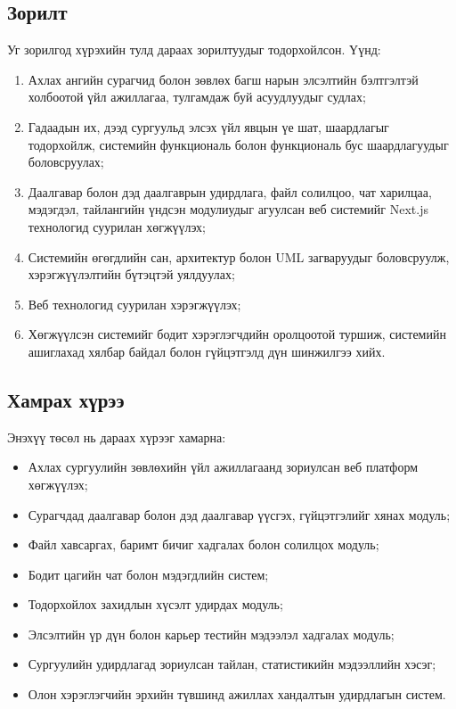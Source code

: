 \subsection*{Зорилт}
Уг зорилгод хүрэхийн тулд дараах зорилтуудыг тодорхойлсон. Үүнд:
\begin{enumerate}[nosep]
    \item Ахлах ангийн сурагчид болон зөвлөх багш нарын элсэлтийн бэлтгэлтэй холбоотой үйл ажиллагаа, тулгамдаж буй асуудлуудыг судлах;
    \item Гадаадын их, дээд сургуульд элсэх үйл явцын үе шат, шаардлагыг тодорхойлж, системийн функциональ болон функциональ бус шаардлагуудыг боловсруулах;
    \item Даалгавар болон дэд даалгаврын удирдлага, файл солилцоо, чат харилцаа, мэдэгдэл, тайлангийн үндсэн модулиудыг агуулсан веб системийг Next.js технологид суурилан хөгжүүлэх;
    \item Системийн өгөгдлийн сан, архитектур болон UML загваруудыг боловсруулж, хэрэгжүүлэлтийн бүтэцтэй уялдуулах;
    \item Веб технологид суурилан хэрэгжүүлэх;
    \item Хөгжүүлсэн системийг бодит хэрэглэгчдийн оролцоотой туршиж, системийн ашиглахад хялбар байдал болон гүйцэтгэлд дүн шинжилгээ хийх.
\end{enumerate}

\subsection*{Хамрах хүрээ}
Энэхүү төсөл нь дараах хүрээг хамарна:
\begin{itemize}
    \item Ахлах сургуулийн зөвлөхийн үйл ажиллагаанд зориулсан веб платформ хөгжүүлэх;
    \item Сурагчдад даалгавар болон дэд даалгавар үүсгэх, гүйцэтгэлийг хянах модуль;
    \item Файл хавсаргах, баримт бичиг хадгалах болон солилцох модуль;
    \item Бодит цагийн чат болон мэдэгдлийн систем;
    \item Тодорхойлох захидлын хүсэлт удирдах модуль;
    \item Элсэлтийн үр дүн болон карьер тестийн мэдээлэл хадгалах модуль;
    \item Сургуулийн удирдлагад зориулсан тайлан, статистикийн мэдээллийн хэсэг;
    \item Олон хэрэглэгчийн эрхийн түвшинд ажиллах хандалтын удирдлагын систем.
\end{itemize}